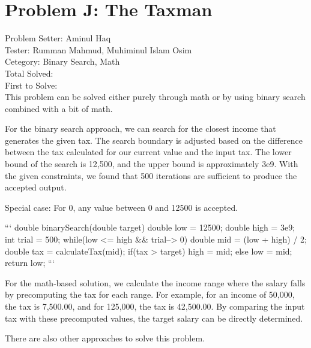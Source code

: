 \section*{Problem J: The Taxman}
Problem Setter: Aminul Haq \\
Tester: Rumman Mahmud,  Muhiminul Islam Osim \\
Cetegory: Binary Search, Math \\
Total Solved:  \\
First to Solve: \\

This problem can be solved either purely through math or by using binary search combined with a bit of math.

For the binary search approach, we can search for the closest income that generates the given tax. The search boundary is adjusted based on the difference between the tax calculated for our current value and the input tax. The lower bound of the search is 12,500, and the upper bound is approximately 3e9. With the given constraints, we found that 500 iterations are sufficient to produce the accepted output.

Special case: For 0, any value between 0 and 12500 is accepted.

```
double binarySearch(double target) {
    double low = 12500;
    double high = 3e9;
    int trial = 500;
    while(low <= high && trial--> 0) {
        double mid = (low + high) / 2;
        double tax = calculateTax(mid);
        if(tax > target) {
            high = mid;
        } else {
            low = mid;
        }
    }
    return low;
}
```

For the math-based solution, we calculate the income range where the salary falls by precomputing the tax for each range. For example, for an income of 50,000, the tax is 7,500.00, and for 125,000, the tax is 42,500.00. By comparing the input tax with these precomputed values, the target salary can be directly determined.

There are also other approaches to solve this problem.
